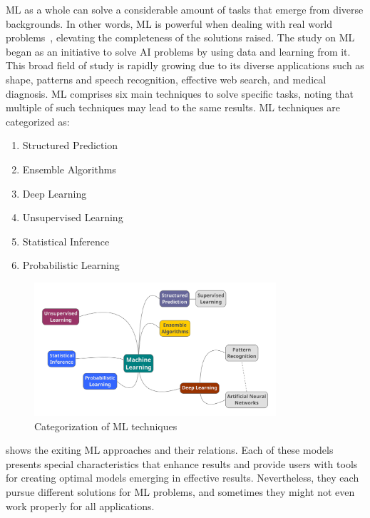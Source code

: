 \ac{ML} as a whole can solve a considerable amount of tasks that emerge from diverse backgrounds. 
In other words, \ac{ML} is powerful when dealing with real world problems~\cite{michalski13}, 
elevating the completeness of the solutions raised. 
The study on \ac{ML} began as an initiative to solve \ac{AI} problems by using data and learning from 
it. This broad field of study is rapidly growing due to its diverse applications such as shape, patterns 
and speech recognition, effective web search, and medical diagnosis. \ac{ML} comprises six main 
techniques to solve specific tasks, noting that multiple of such techniques may lead to the same 
results. \ac{ML} techniques are categorized as:
\begin{enumerate}
 \item Structured Prediction~\cite{taskar05}
 \item Ensemble Algorithms~\cite{dietterich00}
 \item Deep Learning~\cite{lecun15} 
 \item Unsupervised Learning~\cite{hastie09}
 \item Statistical Inference~\cite{robert14} 
 \item Probabilistic Learning~\cite{robert14}
\end{enumerate}

\begin{figure}[htbp]
  \centering
  \includegraphics[width=0.8\textwidth]{images/ai-categorization}
  \caption{Categorization of \acl{ML} techniques}
  \label{fig:ai-categorization}
\end{figure}

 shows the exiting \ac{ML} approaches and their relations. Each of these 
models presents special characteristics that enhance results and provide users with tools for creating 
optimal models emerging in effective results.  Nevertheless, they each pursue different solutions for  
\ac{ML} problems, and sometimes they might not even work properly for all applications. 

